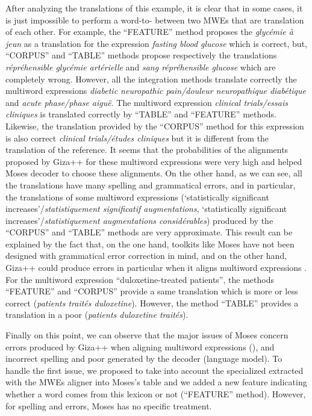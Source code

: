 \documentclass[output=paper,modfonts,nonflat]{langsci/langscibook}
\begin{document}
After analyzing the translations of this example, it is clear that in some cases, it is just impossible to perform a word-to- between two MWEs that are translation of each other. For example, the ``FEATURE'' method proposes the  \textit{glycémie à jeun} as a translation for the expression \textit{fasting blood glucose} which is correct, but, ``CORPUS'' and ``TABLE'' methods propose respectively the translations \textit{répréhensible glycémie artérielle} and \textit{sang répréhensible glucose} which are completely wrong. However, all the integration methods translate correctly the multiword expressions \textit{diabetic neuropath\-ic pain\slash douleur neuropathique diabétique} and \textit{acute phase\slash phase aiguë}. The multiword expression \textit{clinical trials\slash essais cliniques} is translated correctly by ``TABLE'' and ``FEATURE'' methods. Likewise, the translation provided by the ``CORPUS'' method for this expression is also correct \textit{clinical trials\slash études cliniques} but it is different from the translation of the reference. It seems that the probabilities of the alignments proposed by Giza++ for these multiword expressions were very high and helped Moses decoder to choose these alignments. On the other hand, as we can see, all the translations have many spelling and grammatical errors, and in particular, the translations of some multiword expressions (`statistically significant increases'/\textit{statistiquement significatif augmentations}, `statistically significant increases'/\textit{statistiquement augmentations considérables}) produced by the ``CORPUS'' and ``TABLE'' methods are very approximate. This result can be explained by the fact that, on the one hand,  toolkits like Moses have not been designed with grammatical error correction in mind, and on the other hand, Giza++ could produce errors in particular when it aligns multiword expressions  \citep{fraser2007measuring}. For the multiword expression “duloxetine-treated patients”, the methods ``FEATURE'' and ``CORPUS'' provide a same translation which is more or less correct (\textit{patients traités duloxetine}). However, the method ``TABLE'' provides a translation in a poor  (\textit{patients duloxetine traités}).

Finally on this point, we can observe that the major issues of Moses concern errors produced by Giza++ when aligning multiword expressions (), and incorrect spelling and poor  generated by the decoder (language model). To handle the first issue, we proposed to take into account the specialized  extracted with the MWEs aligner into Moses’s  table and we added a new feature indicating whether a word comes from this lexicon or not (``FEATURE'' method). However, for spelling and  errors, Moses has no specific treatment.
\end{document}
